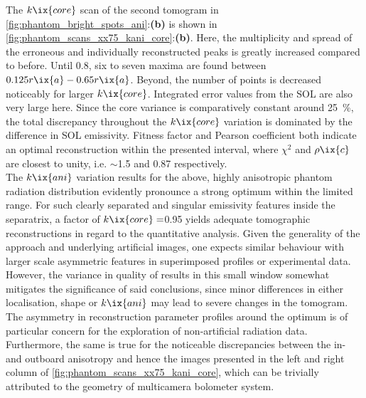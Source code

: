                 The $k\ix{core}$ scan of the second tomogram in \cref{fig:phantom_bright_spots_ani}:\textbf{(b)} is shown in \cref{fig:phantom_scans_xx75_kani_core}:\textbf{(b)}. Here, the multiplicity and spread of the erroneous and individually reconstructed peaks is greatly increased compared to before. Until \SI{0.8}{\arbitraryunit}, six to seven maxima are found between $0.125r\ix{a}-0.65r\ix{a}$. Beyond, the number of points is decreased noticeably for larger $k\ix{core}$. Integrated error values from the SOL are also very large here. Since the core variance is comparatively constant around \SI{25}{\percent}, the total discrepancy throughout the $k\ix{core}$ variation is dominated by the difference in SOL emissivity. Fitness factor and Pearson coefficient both indicate an optimal reconstruction within the presented interval, where $\chi^{2}$ and $\rho\ix{c}$ are closest to unity, i.e. $\sim$\SI{1.5}{\arbitraryunit} and \SI{0.87}{\arbitraryunit} respectively.\\%
                The $k\ix{ani}$ variation results for the above, highly anisotropic phantom radiation distribution evidently pronounce a strong optimum within the limited range. For such clearly separated and singular emissivity features inside the separatrix, a factor of $k\ix{core}=$\SI{0.95}{\arbitraryunit} yields adequate tomographic reconstructions in regard to the quantitative analysis. Given the generality of the approach and underlying artificial images, one expects similar behaviour with larger scale asymmetric features in superimposed profiles or experimental data. However, the variance in quality of results in this small window somewhat mitigates the significance of said conclusions, since minor differences in either localisation, shape or $k\ix{ani}$ may lead to severe changes in the tomogram. The asymmetry in reconstruction parameter profiles around the optimum is of particular concern for the exploration of non-artificial radiation data. Furthermore, the same is true for the noticeable discrepancies between the in- and outboard anisotropy and hence the images presented in the left and right column of \cref{fig:phantom_scans_xx75_kani_core}, which can be trivially attributed to the geometry of multicamera bolometer system.\\%
%
                \newline%
